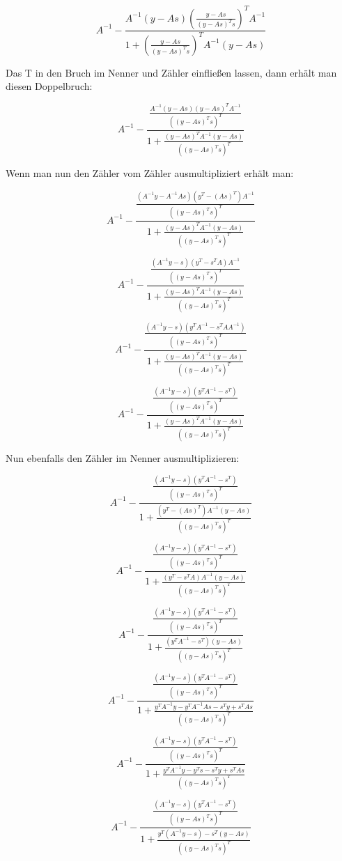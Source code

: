 \documentclass[a4paper, 12pt]{report}
\begin{document}
$$ A^{-1} - \frac{ A^{-1}(y-As)\left(\frac{ y-As }{ (y-As)^Ts } \right)^TA^{-1} }{1 + \left(\frac{ y-As }{ (y-As)^Ts }\right)^TA^{-1}(y-As)}$$

Das T in den Bruch im Nenner und Zähler einfließen lassen, dann erhält man diesen Doppelbruch:

$$ A^{-1} - \frac{ \frac{A^{-1}(y-As)(y-As)^TA^{-1}}{\left( (y-As)^Ts\right)^T } }{1 + \frac{(y-As)^TA^{-1}(y-As)}{\left( (y-As)^Ts\right)^T}}$$

Wenn man nun den Zähler vom Zähler ausmultipliziert erhält man:

$$ A^{-1} - \frac{ \frac{ (A^{-1}y - A^{-1}As)(y^T-(As)^T)A^{-1} }{\left( (y-As)^Ts\right)^T } }{1 + \frac{(y-As)^TA^{-1}(y-As)}{\left( (y-As)^Ts\right)^T}}$$

$$ A^{-1} - \frac{ \frac{ (A^{-1}y - s)(y^T - s^TA)A^{-1} }{\left( (y-As)^Ts\right)^T } }{1 + \frac{(y-As)^TA^{-1}(y-As)}{\left( (y-As)^Ts\right)^T}}$$

$$ A^{-1} - \frac{ \frac{ (A^{-1}y - s)(y^TA^{-1} - s^TAA^{-1}) }{\left( (y-As)^Ts\right)^T } }{1 + \frac{(y-As)^TA^{-1}(y-As)}{\left( (y-As)^Ts\right)^T}}$$

$$ A^{-1} - \frac{ \frac{ (A^{-1}y-s)(y^TA^{-1}-s^T) }{\left( (y-As)^Ts\right)^T } }{1 + \frac{(y-As)^TA^{-1}(y-As)}{\left( (y-As)^Ts\right)^T}}$$

Nun ebenfalls den Zähler im Nenner ausmultiplizieren:

$$ A^{-1} - \frac{ \frac{ (A^{-1}y-s)(y^TA^{-1}-s^T) }{\left( (y-As)^Ts\right)^T } }{1 + \frac{ (y^T - (As)^T)A^{-1}(y - As) }{\left( (y-As)^Ts\right)^T}}$$

$$ A^{-1} - \frac{ \frac{ (A^{-1}y-s)(y^TA^{-1}-s^T) }{\left( (y-As)^Ts\right)^T } }{1 + \frac{ (y^T - s^TA)A^{-1}(y-As) }{\left( (y-As)^Ts\right)^T}}$$

$$ A^{-1} - \frac{ \frac{ (A^{-1}y-s)(y^TA^{-1}-s^T) }{\left( (y-As)^Ts\right)^T } }{1 + \frac{ (y^TA^{-1} - s^T)(y - As) }{\left( (y-As)^Ts\right)^T}}$$

$$ A^{-1} - \frac{ \frac{ (A^{-1}y-s)(y^TA^{-1}-s^T) }{\left( (y-As)^Ts\right)^T } }{1 + \frac{ y^TA^{-1}y - y^TA^{-1}As - s^Ty + s^TAs }{\left( (y-As)^Ts\right)^T}}$$

$$ A^{-1} - \frac{ \frac{ (A^{-1}y-s)(y^TA^{-1}-s^T) }{\left( (y-As)^Ts\right)^T } }{1 + \frac{ y^TA^{-1}y - y^Ts - s^Ty + s^TAs }{\left( (y-As)^Ts\right)^T}}$$

$$ A^{-1} - \frac{ \frac{ (A^{-1}y-s)(y^TA^{-1}-s^T) }{\left( (y-As)^Ts\right)^T } }{1 + \frac{ y^T(A^{-1}y - s) - s^T(y - As) }{\left( (y-As)^Ts\right)^T}}$$
\end{document}
